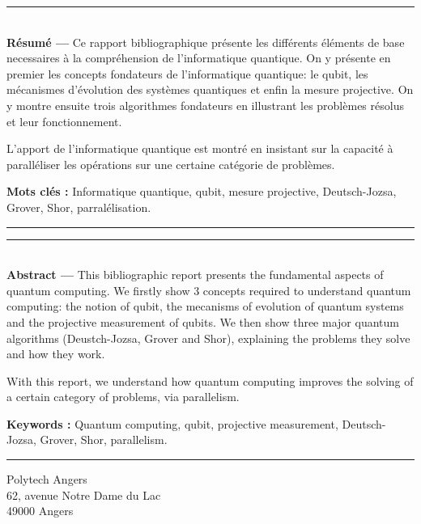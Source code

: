\documentclass[12pt,a4paper]{report}
\begin{document}



\clearpage
\thispagestyle{empty}

\vspace*{\fill}
\noindent\rule[2pt]{\textwidth}{0.5pt}\\
{\textbf{Résumé ---}}
Ce rapport bibliographique présente les différents éléments de base necessaires à la compréhension de l'informatique quantique. On y présente en premier les concepts fondateurs de l'informatique quantique: le qubit, les mécanismes d'évolution des systèmes quantiques et enfin la mesure projective. On y montre ensuite trois algorithmes fondateurs en illustrant les problèmes résolus et leur fonctionnement.

L'apport de l'informatique quantique est montré en insistant sur la capacité à paralléliser les opérations sur une certaine catégorie de problèmes.

{\textbf{Mots clés :}}
Informatique quantique, qubit, mesure projective, Deutsch-Jozsa, Grover, Shor, parralélisation.
\\
\noindent\rule[2pt]{\textwidth}{0.5pt}


\vspace*{\fill}
\noindent\rule[2pt]{\textwidth}{0.5pt}\\
{\textbf{Abstract ---}}
This bibliographic report presents the fundamental aspects of quantum computing. We firstly show 3 concepts required to understand quantum computing: the notion of qubit, the mecanisms of evolution of quantum systems and the projective measurement of qubits. We then show three major quantum algorithms (Deustch-Jozsa, Grover and Shor), explaining the problems they solve and how they work.

With this report, we understand how quantum computing improves the solving of a certain category of problems, via parallelism. 

{\textbf{Keywords :}}
Quantum computing, qubit, projective measurement, Deutsch-Jozsa, Grover, Shor, parallelism.
\\
\noindent\rule[2pt]{\textwidth}{0.5pt}

\begin{center}
  Polytech Angers\\
  62, avenue Notre Dame du Lac\\
  49000 Angers
\end{center}
\vspace*{\fill}
\end{document}
